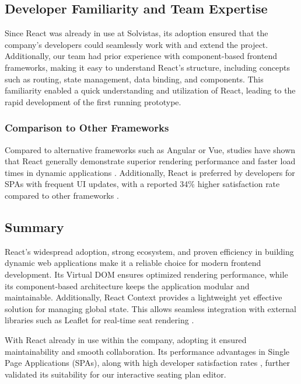 \subsection{Developer Familiarity and Team Expertise}
Since React was already in use at Solvistas, its adoption ensured that the company’s developers could seamlessly work with and extend the project. Additionally, our team had prior experience with component-based frontend frameworks, making it easy to understand React’s structure, including concepts such as routing, state management, data binding, and components. This familiarity enabled a quick understanding and utilization of React, leading to the rapid development of the first running prototype.

\subsubsection{Comparison to Other Frameworks}
Compared to alternative frameworks such as Angular or Vue, studies have shown that React generally demonstrate superior rendering performance and faster load times in dynamic applications \cite{SPAComp}. Additionally, React is preferred by developers for SPAs with frequent UI updates, with a reported 34\% higher satisfaction rate compared to other frameworks \cite{SPAComp}.

\subsection{Summary}
React’s widespread adoption, strong ecosystem, and proven efficiency in building dynamic web applications make it a reliable choice for modern frontend development. Its Virtual DOM ensures optimized rendering performance, while its component-based architecture keeps the application modular and maintainable. Additionally, React Context provides a lightweight yet effective solution for managing global state. This allows seamless integration with external libraries such as Leaflet for real-time seat rendering \cite{ReactVirtualDOM, ReactCBA01}.

With React already in use within the company, adopting it ensured maintainability and smooth collaboration. Its performance advantages in Single Page Applications (SPAs), along with high developer satisfaction rates \cite{SPAComp}, further validated its suitability for our interactive seating plan editor.

